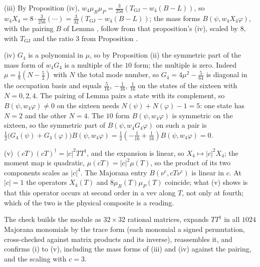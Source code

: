 (iii) By Proposition (iv), $w_{4}\mu_{R}\mu_{P} = \tfrac{3}{256}(T_{\mathrm{GJ}} - w_{4}(B - L))$, so $w_{4}X_{4} = 8 \cdot \tfrac{3}{256}(\cdots) = \tfrac{3}{32}(T_{\mathrm{GJ}} - w_{4}(B - L))$; the mass forms $B(\psi, w_{4}X_{4}\varphi)$, with the pairing $B$ of Lemma , follow from that proposition's (iv), scaled by $8$, with $T_{\mathrm{GJ}}$ and the ratio $3$ from Proposition .

(iv) $G_{4}$ is a polynomial in $\mu$, so by Proposition (ii) the symmetric part of the mass form of $w_{4}G_{4}$ is a multiple of the $10$ form; the multiple is zero. Indeed $\mu = \tfrac18(N - \tfrac52)$ with $N$ the total mode number, so $G_{4} = 4\mu^{2} - \tfrac{5}{64}$ is diagonal in the occupation basis and equals $\tfrac{5}{16}$, $-\tfrac{1}{16}$, $\tfrac{1}{16}$ on the states of the sixteen with $N = 0, 2, 4$. The pairing of Lemma  pairs a state with its complement, so $B(\psi, w_{4}\varphi) \ne 0$ on the sixteen needs $N(\psi) + N(\varphi) - 1 = 5$: one state has $N = 2$ and the other $N = 4$. The $10$ form $B(\psi, w_{4}\varphi)$ is symmetric on the sixteen, so the symmetric part of $B(\psi, w_{4}G_{4}\varphi)$ on such a pair is $\tfrac12\bigl(G_{4}(\psi) + G_{4}(\varphi)\bigr)B(\psi, w_{4}\varphi) = \tfrac12(-\tfrac{1}{16} + \tfrac{1}{16})B(\psi, w_{4}\varphi) = 0$.

(v) $(cT)(cT)^{\dagger} = |c|^{2}TT^{\dagger}$, and the expansion is linear, so $X_{4} \mapsto |c|^{2}X_{4}$; the moment map is quadratic, $\mu(cT) = |c|^{2}\mu(T)$, so the product of its two components scales as $|c|^{4}$. The Majorana entry $B(\nu^{c}, cT\nu^{c})$ is linear in $c$. At $|c| = 1$ the operators $X_{4}(T)$ and $8\mu_{R}(T)\mu_{P}(T)$ coincide; what (v) shows is that this operator occurs at second order in a vev along $T$, not only at fourth; which of the two is the physical composite is a reading.

The check builds the module as $32 \times 32$ rational matrices, expands $TT^{\dagger}$ in all $1024$ Majorana monomials by the trace form (each monomial a signed permutation, cross-checked against matrix products and its inverse), reassembles it, and confirms (i) to (v), including the mass forms of (iii) and (iv) against the pairing, and the scaling with $c = 3$.
